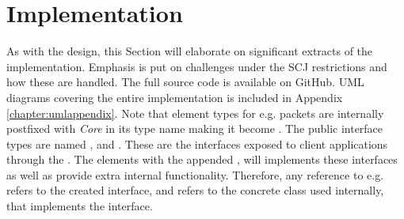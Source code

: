 \section{Implementation}
As with the design, this Section will elaborate on significant extracts of the implementation. Emphasis is put on challenges under the SCJ restrictions and how these are handled. The full source code is available on GitHub\cite{SW902e12:CSPinSCJ}. UML diagrams covering the entire implementation is included in Appendix \ref{chapter:umlappendix}. Note that element types for e.g. packets are internally postfixed with \textit{Core} in its type name making it become . The public interface types are named ,  and . These are the interfaces exposed to client applications through the . The elements with the appended , will implements these interfaces as well as provide extra internal functionality. Therefore, any reference to e.g.  refers to the created interface, and  refers to the concrete class used internally, that implements the interface.